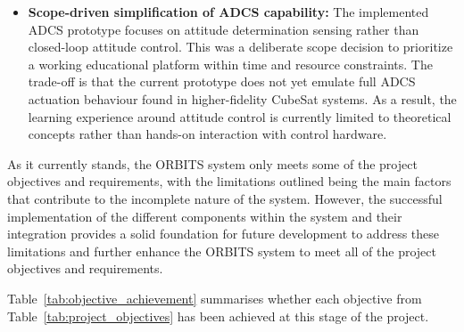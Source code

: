 \documentclass[a4paper,12pt,titlepage]{report}
\begin{document}
\begin{itemize}
\item \textbf{Scope-driven simplification of ADCS capability:}  
The implemented ADCS prototype focuses on attitude determination sensing rather than closed-loop attitude control. This was a deliberate scope decision to prioritize a working educational platform within time and resource constraints. The trade-off is that the current prototype does not yet emulate full ADCS actuation behaviour found in higher-fidelity CubeSat systems. As a result, the learning experience around attitude control is currently limited to theoretical concepts rather than hands-on interaction with control hardware.
\end{itemize}

As it currently stands, the ORBITS system only meets some of the project objectives and requirements, with the limitations outlined being the main factors that contribute to the incomplete nature of the system. However, the successful implementation of the different components within the system and their integration provides a solid foundation for future development to address these limitations and further enhance the ORBITS system to meet all of the project objectives and requirements.

Table~\ref{tab:objective_achievement} summarises whether each objective from Table~\ref{tab:project_objectives} has been achieved at this stage of the project.
\end{document}
